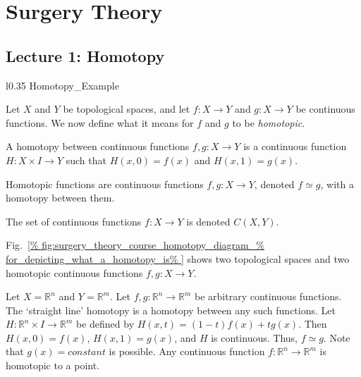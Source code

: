 \documentclass[crop=false,class=article,oneside]{standalone}
\begin{document}
    \ifx\ifmathcoursessurgery\undefined
        \section*{Surgery Theory}
        \setcounter{section}{1}
        \renewcommand\thefigure{%
            \arabic{section}.\arabic{figure}%
        }
        \renewcommand\thesubfigure{%
            \arabic{section}.\arabic{figure}.\arabic{subfigure}%
        }
    \fi
    \subsection{Lecture 1: Homotopy}
        \begin{wrapfigure}[8]{l}{0.35\textwidth}
            \centering
            \captionsetup{type=figure}
            {Homotopy_Example}
            \caption[Homotopy Diagram.]
                    {Diagram for a homotopy between two
                    functions $f,g:X\rightarrow Y$.}
            \label{fig:surgery_theory_course_homotopy_diagram_%
                   for_depicting_what_a_homotopy_is}
        \end{wrapfigure}
        Let $X$ and $Y$ be topological spaces, and let
        $f:{X}\rightarrow{Y}$ and $g:{X}\rightarrow{Y}$
        be continuous functions. We now define what it
        means for $f$ and $g$ to be \textit{homotopic}.
        \begin{definition}
            A homotopy between continuous functions
            $f,g:{X}\rightarrow{Y}$ is a continuous
            function $H:{X}\times{I}\rightarrow{Y}$
            such that $H(x,0)=f(x)$ and $H(x,1)=g(x)$.
        \end{definition}
        \begin{definition}
            Homotopic functions are continuous functions
            $f,g:{X}\rightarrow{Y}$, denoted ${f}\simeq{g}$,
            with a homotopy between them.
        \end{definition}
        \begin{notation}
            The set of continuous functions
            $f:{X}\rightarrow{Y}$ is denoted $C(X,Y)$.
        \end{notation}
        Fig.~\ref{%
            fig:surgery_theory_course_homotopy_diagram_%
            for_depicting_what_a_homotopy_is%
        }
        shows two topological spaces and two homotopic
        continuous functions $f,g:{X}\rightarrow{Y}$.
        \begin{example}
            Let $X=\mathbb{R}^{n}$ and $Y=\mathbb{R}^{m}$. Let
            $f,g:\mathbb{R}^{n}\rightarrow\mathbb{R}^{m}$
            be arbitrary continuous functions.
            The `straight line' homotopy is a homotopy
            between any such functions. Let
            $H:\mathbb{R}^{n}\times{I}\rightarrow\mathbb{R}^{m}$
            be defined by $H(x,t)=(1-t)f(x)+tg(x)$. Then
            $H(x,0)=f(x)$, $H(x,1)=g(x)$, and
            $H$ is continuous. Thus, ${f}\simeq{g}$.
            Note that $g(x)=constant$ is possible.
            Any continuous function
            $f:\mathbb{R}^{n}\rightarrow\mathbb{R}^{m}$
            is homotopic to a point.
        \end{example}
\end{document}
